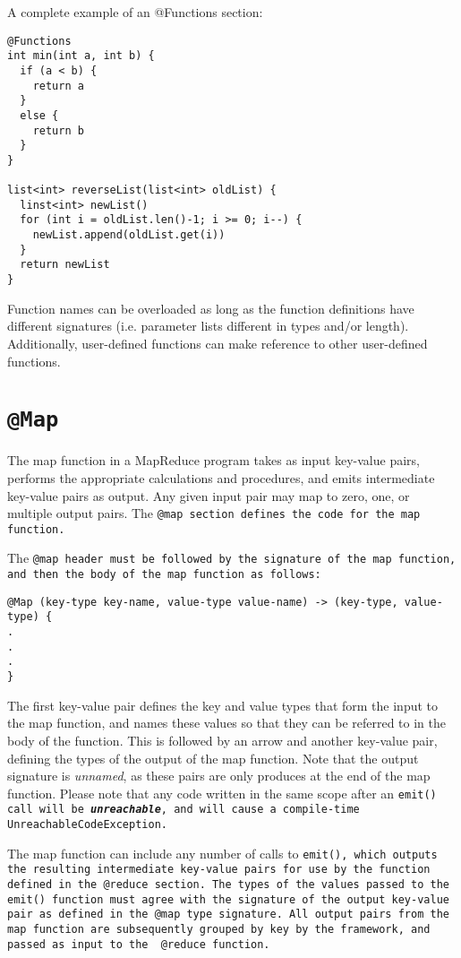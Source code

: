 \documentclass{book}
\begin{document}
A complete example of an @Functions section:

\begin{verbatim}
@Functions
int min(int a, int b) {
  if (a < b) {
    return a
  }
  else {
    return b
  }
}

list<int> reverseList(list<int> oldList) {
  linst<int> newList()
  for (int i = oldList.len()-1; i >= 0; i--) {
    newList.append(oldList.get(i))
  }
  return newList
}
\end{verbatim}

Function names can be overloaded as long as the function definitions have different
signatures (i.e. parameter lists different in types and/or length). Additionally,
user-defined functions can make reference to other user-defined functions.


\section{\tt @Map \rm} %
\label{sec:tt_map_rm}

The map function in a MapReduce program takes as input key-value pairs, performs
the appropriate calculations and procedures, and emits intermediate key-value pairs
as output. Any given input pair may map to zero, one, or multiple output pairs. The
\tt @map \rm section defines the code for the map function.

The \tt @map \rm header must be followed by the signature of the map function, and
then the body of the map function as follows:

\begin{verbatim}
@Map (key-type key-name, value-type value-name) -> (key-type, value-type) {
.
.
.
}
\end{verbatim}

The first key-value pair defines the key and value types that form the input to the map function, and names these values so
that they can be referred to in the body of the function. This is followed by an arrow and another key-value pair, defining the
types of the output of the map function. Note that the output signature is \emph{unnamed}, as these pairs are only produces at
the end of the map function. Please note that any code written in the same scope after an \tt emit() \rm call will be
\textbf{\emph{unreachable}}, and will cause a compile-time \tt UnreachableCodeException\rm.

The map function can include any number of calls to \tt emit()\rm, which outputs
the resulting intermediate key-value pairs for use by the function defined in the
\tt @reduce \rm section. The types of the values passed to the \tt emit() \rm
function must agree with the signature of the output key-value pair as defined in
the \tt @map \rm type signature. All output pairs from the map function are
subsequently grouped by key by the framework, and passed as input to the \tt
@reduce \rm function.
\end{document}
